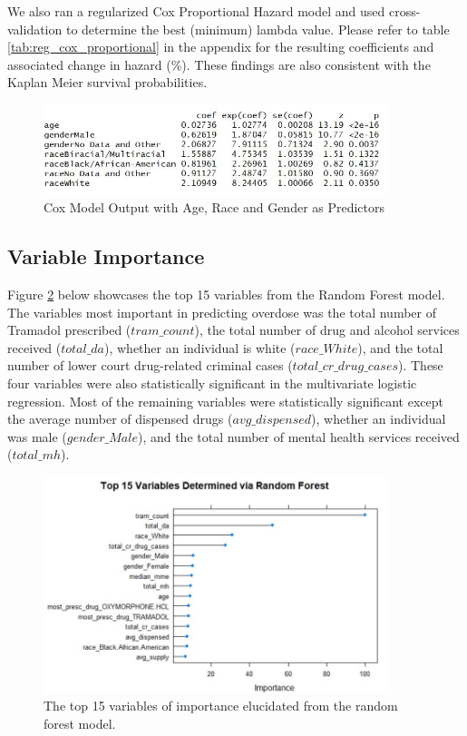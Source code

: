 \documentclass[twoside,10.5pt]{article}
\begin{document}
We also ran a regularized Cox Proportional Hazard model and used cross-validation to determine the best (minimum) lambda value. Please refer to table \ref{tab:reg_cox_proportional} in the appendix for the resulting coefficients and associated change in hazard (\%). These findings are also consistent with the Kaplan Meier survival probabilities. 

\begin{figure}[htp]
\centering
\includegraphics[width=10cm]{images/cox_model.JPG}
\caption{Cox Model Output with Age, Race and Gender as Predictors}
\label{fig:cox_model}
\end{figure}

\subsection{Variable Importance}
Figure \ref{fig:var_importance} below showcases the top 15 variables from the Random Forest model. The variables most important in predicting overdose was the total number of Tramadol prescribed ($tram\_count$), the total number of drug and alcohol services received ($total\_da$), whether an individual is white ($race\_White$), and the total number of lower court drug-related criminal cases ($total\_cr\_drug\_cases$). These four variables were also statistically significant in the multivariate logistic regression. Most of the remaining variables were statistically significant except the average number of dispensed drugs ($avg\_dispensed$), whether an individual was male ($gender\_Male$), and the total number of mental health services received ($total\_mh$). 

\begin{figure}[h!]
\centering
\includegraphics[width=10cm]{images/variable_importance.JPG}
\caption{The top 15 variables of importance elucidated from the random forest model.}
\label{fig:var_importance}
\end{figure}
\end{document}

